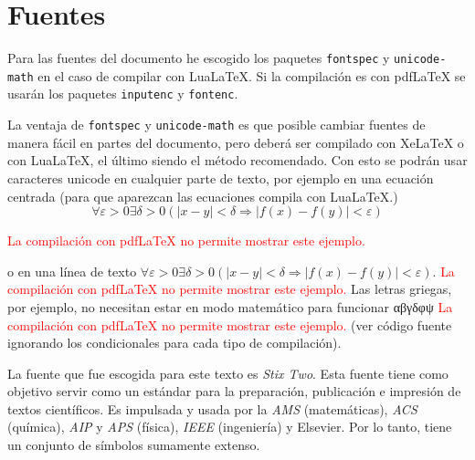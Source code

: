 
\chapter{Fuentes}
Para las fuentes del documento he escogido los paquetes \texttt{fontspec} y
\texttt{unicode-math} en el caso de compilar con Lua\LaTeX. Si la
compilación es con pdf\LaTeX{} se usarán los paquetes \texttt{inputenc} y
\texttt{fontenc}.

La ventaja de \texttt{fontspec} y \texttt{unicode-math} es que posible
cambiar fuentes de manera fácil en partes del documento, pero deberá ser
compilado con Xe\LaTeX{} o con Lua\LaTeX, el último siendo el método
recomendado. Con esto se podrán usar caracteres unicode en cualquier parte
de texto, por ejemplo en una ecuación centrada (para que aparezcan las
ecuaciones compila con Lua\LaTeX.)
\ifluatex%
\[
  ∀ε>0∃δ>0(|x-y|<δ ⇒ |f(x)-f(y)|<ε)
\]
\else
\ifpdftex%
\begin{center}
\textcolor{red}{La compilación con pdf\LaTeX{} no permite mostrar este
ejemplo.}
\end{center}
\fi
\fi
o en una línea de texto%
\ifluatex%
\(∀ε>0∃δ>0(|x-y|<δ ⇒ |f(x)-f(y)|<ε)\).
\else
\ifpdftex%
\textcolor{red}{La compilación con pdf\LaTeX{} no permite mostrar este
ejemplo.}
\fi
\fi
Las letras griegas, por ejemplo, no necesitan estar en modo matemático para
funcionar
\ifluatex%
αβγδφψ
\else
\ifpdftex%
\textcolor{red}{La compilación con pdf\LaTeX{} no permite mostrar este
ejemplo.}
\fi
\fi
(ver código fuente ignorando los condicionales para cada tipo de
compilación).

La fuente que fue escogida para este texto es \textit{Stix Two}. Esta fuente
tiene como objetivo servir como un estándar para la preparación, publicación
e impresión de textos científicos. Es impulsada y usada por la \textit{AMS}
(matemáticas), \textit{ACS} (química), \textit{AIP} y \textit{APS} (física),
\textit{IEEE} (ingeniería) y Elsevier. Por lo tanto, tiene un conjunto de
símbolos sumamente extenso.

